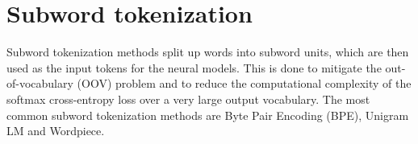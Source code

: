 












\section{Subword tokenization}

Subword tokenization methods split up words into subword units, which are then used as the input tokens for the neural models. This is done to mitigate the out-of-vocabulary (OOV) problem and to reduce the computational complexity of the softmax cross-entropy loss over a very large output vocabulary. The most common subword tokenization methods are Byte Pair Encoding (BPE), Unigram LM and Wordpiece.

